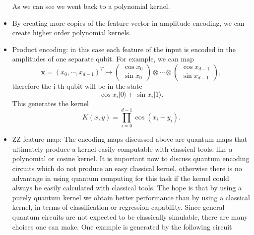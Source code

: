 \documentclass[12pt]{article}
\begin{document}
\begin{itemize}
\begin{equation}
    \end{equation}
    As we can see we went back to a polynomial kernel. 
    \item By creating more copies of the feature vector in amplitude encoding, we can create higher order polynomial kernels. 
    \item Product encoding: in this case each feature of the input is encoded in the amplitudes of one separate qubit. For example, we can map
    \begin{equation}
        \mathbf{x}=(x_0, \cdots, x_{d-1})^T \mapsto  \begin{pmatrix}
            \cos x_0\\\sin x_0
           \end{pmatrix} \otimes \cdots \otimes \begin{pmatrix}
            \cos x_{d-1}\\\sin x_{d-1}
           \end{pmatrix},
    \end{equation}
    therefore the i-th qubit will be in the state 
    \begin{equation}
        \cos x_i|0\rangle +\sin x_i |1\rangle. 
    \end{equation}
    This generates the kernel 
    \begin{equation}
        K(x,y)=\prod_{i=0}^{d-1}\cos(x_i-y_i).
    \end{equation}
    \item ZZ feature map: The encoding maps discussed above are quantum maps that ultimately produce a kernel easily computable with classical tools, like a polynomial or cosine kernel. It is important now to discuss quantum encoding circuits which do not produce an easy classical kernel, otherwise there is no advantage in using quantum computing for this task if the kernel could always be easily calculated with classical tools. The hope is that by using a purely quantum kernel we obtain better performance than by using a classical kernel, in terms of classification or regression capability. Since general quantum circuits are not expected to be classically simulable, there are many choices one can make. One example is generated by the following circuit 


\end{itemize}
\end{document}
